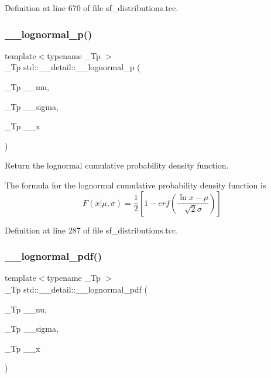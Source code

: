 Definition at line 670 of file sf\+\_\+distributions.\+tcc.

\mbox{\label{namespacestd_1_1____detail_a332aebbc96ef310620918cb6becb9760}} 
\subsubsection{\texorpdfstring{\+\_\+\+\_\+lognormal\+\_\+p()}{\_\_lognormal\_p()}}
{\footnotesize\ttfamily template$<$typename \+\_\+\+Tp $>$ \\
\+\_\+\+Tp std\+::\+\_\+\+\_\+detail\+::\+\_\+\+\_\+lognormal\+\_\+p (\begin{DoxyParamCaption}\item[{\+\_\+\+Tp}]{\+\_\+\+\_\+mu,  }\item[{\+\_\+\+Tp}]{\+\_\+\+\_\+sigma,  }\item[{\+\_\+\+Tp}]{\+\_\+\+\_\+x }\end{DoxyParamCaption})}



Return the lognormal cumulative probability density function. 

The formula for the lognormal cumulative probability density function is \[ F(x|\mu,\sigma) = \frac{1}{2}\left[ 1-erf(\frac{\ln{x}-\mu}{\sqrt{2}\sigma}) \right] \] 

Definition at line 287 of file sf\+\_\+distributions.\+tcc.

\mbox{\label{namespacestd_1_1____detail_a46c5dea7a38f38965bce5a84d389a02b}} 
\subsubsection{\texorpdfstring{\+\_\+\+\_\+lognormal\+\_\+pdf()}{\_\_lognormal\_pdf()}}
{\footnotesize\ttfamily template$<$typename \+\_\+\+Tp $>$ \\
\+\_\+\+Tp std\+::\+\_\+\+\_\+detail\+::\+\_\+\+\_\+lognormal\+\_\+pdf (\begin{DoxyParamCaption}\item[{\+\_\+\+Tp}]{\+\_\+\+\_\+nu,  }\item[{\+\_\+\+Tp}]{\+\_\+\+\_\+sigma,  }\item[{\+\_\+\+Tp}]{\+\_\+\+\_\+x }\end{DoxyParamCaption})}



